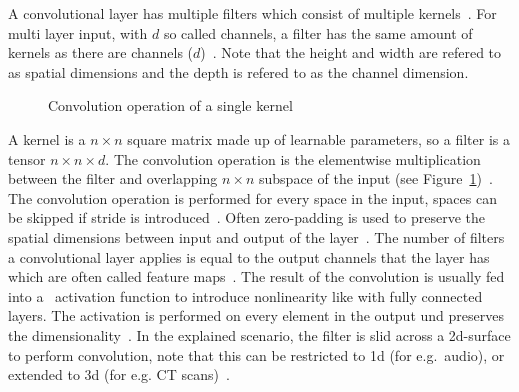 A convolutional layer has multiple filters which consist of multiple
kernels~\citep{chauhan_review_2018}.
For multi layer input, with $d$ so called channels, a filter has the same amount of kernels as there
are channels ($d$)~\citep{ponti_everything_2017}.
Note that the height and width are refered to as spatial dimensions and the depth is refered to as
the channel dimension.
\begin{figure}[ht]
    \centering
    
    \caption[Visualization of a convolution operation]{%
        Convolution operation of a single kernel~\citep{chauhan_review_2018}\label{fig:conv-layer}
    }
\end{figure}
A kernel is a $n\times n$ square matrix made up of learnable parameters, so a filter is a tensor
$n\times n\times d$.
The convolution operation is the elementwise multiplication between the filter and overlapping
$n\times n$ subspace of the input (see Figure~\ref{fig:conv-layer})~\citep{ponti_everything_2017}.
The convolution operation is performed for every space in the input, spaces can be skipped if
stride is introduced~\citep{ponti_everything_2017}.
Often zero-padding is used to preserve the spatial dimensions between input and output of
the layer~\citep{ponti_everything_2017,simonyan_very_2015}.
The number of filters a convolutional layer applies is equal to the output channels that the layer
has which are often called feature maps~\citep{ponti_everything_2017}.
The result of the convolution is usually fed into a \relu\ activation function to introduce
nonlinearity like with fully connected layers.
The activation is performed on every element in the output und preserves the
dimensionality~\citep{ponti_everything_2017}.
In the explained scenario, the filter is slid across a 2d-surface to perform convolution, note that
this can be restricted to 1d (for e.g.\ audio), or extended to 3d (for e.g. CT
scans)~\citep{goodfellow_deep_2016}.

